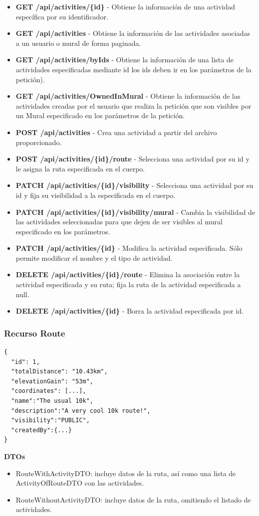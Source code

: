 \begin{itemize}
    \item \textbf{GET /api/activities/\{id\}} - Obtiene la información de una actividad específica por su identificador.
    \item \textbf{GET /api/activities} - Obtiene la información de las actividades asociadas a un usuario o mural de forma paginada.
    \item \textbf{GET /api/activities/byIds} - Obtiene la información de una lista de actividades especificadas mediante id los ids deben ir en los parámetros de la petición).
    \item \textbf{GET /api/activities/OwnedInMural} - Obtiene la información de las actividades creadas por el usuario que realiza la petición que son visibles por un Mural especificado en los parámetros de la petición.
    \item \textbf{POST /api/activities} - Crea una actividad a partir del archivo proporcionado.
    \item \textbf{POST /api/activities/\{id\}/route} - Selecciona una actividad por su id y le asigna la ruta especificada en el cuerpo.
    \item \textbf{PATCH /api/activities/\{id\}/visibility} - Selecciona una actividad por su id y fija su visibilidad a la especificada en el cuerpo.
    \item \textbf{PATCH /api/activities/\{id\}/visibility/mural} - Cambia la visibilidad de las actividades seleccionadas para que dejen de ser visibles al mural especificado en los parámetros.
    \item \textbf{PATCH /api/activities/\{id\}} - Modifica la actividad especificada. Sólo permite modificar el nombre y el tipo de actividad.
    \item \textbf{DELETE /api/activities/\{id\}/route} - Elimina la asociación entre la actividad especificada y su ruta; fija la ruta de la actividad especificada a null.
    \item \textbf{DELETE /api/activities/\{id\}} - Borra la actividad especificada por id.
\end{itemize}

\subsubsection{Recurso Route}
\begin{lstlisting}[basicstyle=\jsonbasicfont,frame=single,backgroundcolor=\color{white},rulecolor=\color{black},framerule=0.5pt,numbers=none]
{
  "id": 1,
  "totalDistance": "10.43km",
  "elevationGain": "53m",
  "coordinates": [...],
  "name":"The usual 10k",
  "description":"A very cool 10k route!",
  "visibility":"PUBLIC",
  "createdBy":{...}
}
\end{lstlisting}
\textbf{DTOs}
\begin{itemize}
    \item RouteWithActivityDTO: incluye datos de la ruta, así como una lista de ActivityOfRouteDTO con las actividades.
    \item RouteWithoutActivityDTO: incluye datos de la ruta, omitiendo el listado de actividades.
\end{itemize}


